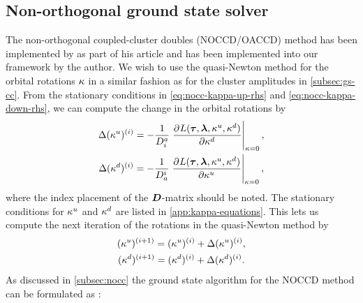         \subsection{Non-orthogonal ground state solver}
            The non-orthogonal coupled-cluster doubles (NOCCD/OACCD) method has been
            implemented by \citeauthor{rolf-nocc} as part of his article
             \cite{rolf-nocc} and has been implemented into
            our framework by the author.
            We wish to use the quasi-Newton method for the orbital rotations
            $\kappa$ in a similar fashion as for the cluster amplitudes in
            \autoref{subsec:gs-cc}.
            From the stationary conditions in \autoref{eq:nocc-kappa-up-rhs} and
            \autoref{eq:nocc-kappa-down-rhs}, we can compute the change in the
            orbital rotations by \cite{ugur-occ}
            \begin{gather}
                \Delta (\noccten^{u})^{(i)}
                = -\frac{1}{D^a_i}
                \left.
                \dpd{
                    L(\vfg{\clustamp}, \vfg{\clustlamp},
                    \noccten^{u}, \noccten^{d})
                }{
                    {\noccten^{d}}
                }
                \right\rvert_{\noccten = 0},
                \\
                \Delta (\noccten^{d})^{(i)}
                = -\frac{1}{D^i_a}
                \left.
                \dpd{
                    L(\vfg{\clustamp}, \vfg{\clustlamp},
                    \noccten^{u}, \noccten^{d})
                }{
                    {\noccten^{u}}
                }
                \right\rvert_{\noccten = 0},
            \end{gather}
            where the index placement of the $\boldsymbol{D}$-matrix should be noted.
            The stationary conditions for $\kappa^{u}$ and $\kappa^{d}$ are
            listed in \autoref{app:kappa-equations}.
            This lets us compute the next iteration of the rotations in the
            quasi-Newton method by
            \begin{gather}
                (\kappa^{u})^{(i + 1)}
                = (\kappa^{u})^{(i)} + \Delta(\kappa^{u})^{(i)}, \\
                (\kappa^{d})^{(i + 1)}
                = (\kappa^{d})^{(i)} + \Delta(\kappa^{d})^{(i)}.
            \end{gather}
            As discussed in \autoref{subsec:nocc} the ground state algorithm for
            the NOCCD method can be formulated as \cite{ugur-occ, rolf-nocc}:
